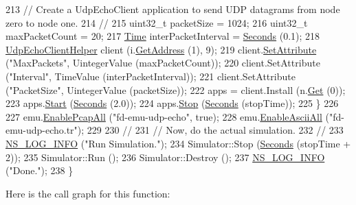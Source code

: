 \begin{DoxyCode}
213       \textcolor{comment}{// Create a UdpEchoClient application to send UDP datagrams from node zero to node one.}
214       \textcolor{comment}{//}
215       uint32\_t packetSize = 1024;
216       uint32\_t maxPacketCount = 20;
217       \hyperlink{classns3_1_1Time}{Time} interPacketInterval = \hyperlink{group__timecivil_ga33c34b816f8ff6628e33d5c8e9713b9e}{Seconds} (0.1);
218       \hyperlink{classns3_1_1UdpEchoClientHelper}{UdpEchoClientHelper} client (i.\hyperlink{classns3_1_1Ipv4InterfaceContainer_ae63208dcd222be986822937ee4aa828c}{GetAddress} (1), 9);
219       client.\hyperlink{classns3_1_1UdpEchoClientHelper_a11228c069ad896f8ed13f4d37c13f51d}{SetAttribute} (\textcolor{stringliteral}{"MaxPackets"}, UintegerValue (maxPacketCount));
220       client.SetAttribute (\textcolor{stringliteral}{"Interval"}, TimeValue (interPacketInterval));
221       client.SetAttribute (\textcolor{stringliteral}{"PacketSize"}, UintegerValue (packetSize));
222       apps = client.Install (n.\hyperlink{classns3_1_1NodeContainer_a9ed96e2ecc22e0f5a3d4842eb9bf90bf}{Get} (0));
223       apps.\hyperlink{classns3_1_1ApplicationContainer_a8eff87926507020bbe3e1390358a54a7}{Start} (\hyperlink{group__timecivil_ga33c34b816f8ff6628e33d5c8e9713b9e}{Seconds} (2.0));
224       apps.\hyperlink{classns3_1_1ApplicationContainer_adfc52f9aa4020c8714679b00bbb9ddb3}{Stop} (\hyperlink{group__timecivil_ga33c34b816f8ff6628e33d5c8e9713b9e}{Seconds} (stopTime));
225     \}
226 
227   emu.\hyperlink{classns3_1_1PcapHelperForDevice_a4ab183a2512120200d4a0e5d8ececd49}{EnablePcapAll} (\textcolor{stringliteral}{"fd-emu-udp-echo"}, \textcolor{keyword}{true});
228   emu.\hyperlink{classns3_1_1AsciiTraceHelperForDevice_a63e57c878526c732924e14c1e52cca8b}{EnableAsciiAll} (\textcolor{stringliteral}{"fd-emu-udp-echo.tr"});
229 
230   \textcolor{comment}{//}
231   \textcolor{comment}{// Now, do the actual simulation.}
232   \textcolor{comment}{//}
233   \hyperlink{group__logging_gafbd73ee2cf9f26b319f49086d8e860fb}{NS\_LOG\_INFO} (\textcolor{stringliteral}{"Run Simulation."});
234   Simulator::Stop (\hyperlink{group__timecivil_ga33c34b816f8ff6628e33d5c8e9713b9e}{Seconds} (stopTime + 2));
235   Simulator::Run ();
236   Simulator::Destroy ();
237   \hyperlink{group__logging_gafbd73ee2cf9f26b319f49086d8e860fb}{NS\_LOG\_INFO} (\textcolor{stringliteral}{"Done."});
238 \}
\end{DoxyCode}


Here is the call graph for this function\+:


